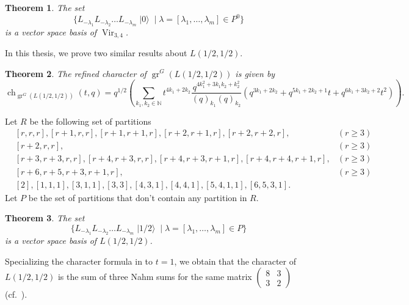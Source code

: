 \documentclass[a4paper, 12pt, reqno]{amsart}
\newtheorem{theorem}{Theorem}[section]
\theoremstyle{remark}
\numberwithin{equation}{subsection}
\DeclareMathOperator{\Vir}{Vir}
\DeclareMathOperator{\gr}{gr}
\DeclareMathOperator{\ch}{ch}
\DeclareMathOperator{\vac}{|0\rangle}
\DeclareMathOperator{\vachalf}{|1/2\rangle}
\begin{document}
\begin{theorem}
  \label{thr:2}
  The set
  \begin{equation*}
    \{L_{-\lambda_1}L_{-\lambda_2}\dots L_{-\lambda_m}\vac \mid \lambda = [\lambda_1, \dots, \lambda_m] \in P^0\}
  \end{equation*}
  is a vector space basis of $\Vir_{3, 4}$.
\end{theorem}

In this thesis, we prove two similar results about $L(1/2, 1/2)$.

\begin{theorem}
  \label{thr:3}
  The refined character of $\gr^G(L(1/2, 1/2))$ is given by
  \begin{equation*}
    \ch_{\gr^G(L(1/2, 1/2))}(t, q) = q^{1/2}\left(\sum_{k_1, k_2 \in \mathbb{N}}t^{4k_1 + 2k_2}\frac{q^{4k_1^2 + 3k_1k_2 + k_2^2}}{(q)_{k_1}(q)_{k_2}}(q^{3k_1 + 2k_2} + q^{5k_1 + 2k_2 + 1}t + q^{6k_1 + 3k_2 + 2}t^2)\right).
  \end{equation*}
\end{theorem}

Let $R$ be the following set of partitions
\begin{align*}
  &[r, r, r], [r + 1, r, r], [r + 1, r + 1, r], [r + 2, r + 1, r], [r + 2, r + 2, r], &(r \ge 3) \\
  &[r + 2, r, r], &(r \ge 3) \\
  &[r + 3, r + 3, r, r], [r + 4, r + 3, r, r],  [r + 4, r + 3, r + 1, r], [r + 4, r + 4, r + 1, r], &(r \ge 3)\\
  &[r + 6, r + 5, r + 3, r + 1, r], &(r \ge 3) \\
  &[2], [1, 1, 1], [3, 1, 1], [3, 3], [4, 3, 1], [4, 4, 1], [5, 4, 1, 1], [6, 5, 3, 1].
\end{align*}
Let $P$ be the set of partitions that don't contain any partition in $R$.

\begin{theorem}
  \label{thr:4}
  The set
  \begin{equation*}
    \{L_{-\lambda_1}L_{-\lambda_2}\dots L_{-\lambda_m}\vachalf \mid \lambda = [\lambda_1, \dots, \lambda_m] \in P\}
  \end{equation*}
  is a vector space basis of $L(1/2, 1/2)$.
\end{theorem}

Specializing the character formula in  to $t = 1$, we obtain that the character of $L(1/2, 1/2)$ is the sum of three Nahm sums for the same matrix $\left(\begin{smallmatrix} 8 & 3 \\ 3 & 2 \end{smallmatrix}\right)$ (cf.\ \cite{Nahm2007}).
\end{document}
